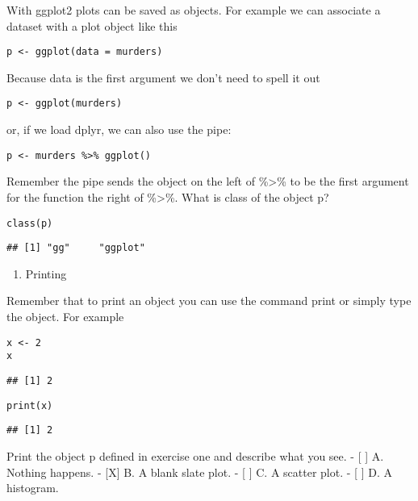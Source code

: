 \documentclass[]{article}
\providecommand{\tightlist}{%
  \setlength{\itemsep}{0pt}\setlength{\parskip}{0pt}}
\begin{document}
With ggplot2 plots can be saved as objects. For example we can associate
a dataset with a plot object like this

\begin{verbatim}
p <- ggplot(data = murders)
\end{verbatim}

Because data is the first argument we don't need to spell it out

\begin{verbatim}
p <- ggplot(murders)
\end{verbatim}

or, if we load dplyr, we can also use the pipe:

\begin{verbatim}
p <- murders %>% ggplot()
\end{verbatim}

Remember the pipe sends the object on the left of \%\textgreater{}\% to
be the first argument for the function the right of \%\textgreater{}\%.
What is class of the object p?

\begin{verbatim}
class(p)
\end{verbatim}

\begin{verbatim}
## [1] "gg"     "ggplot"
\end{verbatim}

\begin{enumerate}
\def\labelenumi{\arabic{enumi}.}
\setcounter{enumi}{1}
\tightlist
\item
  Printing
\end{enumerate}

Remember that to print an object you can use the command print or simply
type the object. For example

\begin{verbatim}
x <- 2
x
\end{verbatim}

\begin{verbatim}
## [1] 2
\end{verbatim}

\begin{verbatim}
print(x)
\end{verbatim}

\begin{verbatim}
## [1] 2
\end{verbatim}

Print the object p defined in exercise one and describe what you see. -
{[} {]} A. Nothing happens. - {[}X{]} B. A blank slate plot. - {[} {]}
C. A scatter plot. - {[} {]} D. A histogram.
\end{document}

